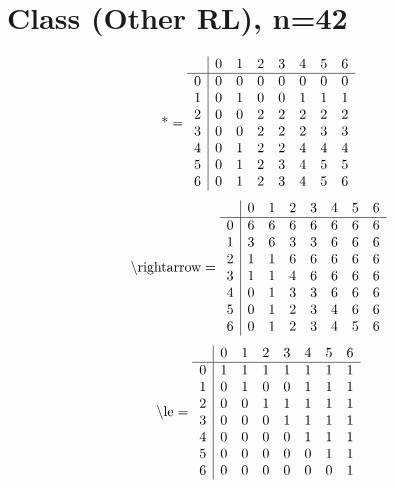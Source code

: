 \documentclass[11pt]{article}
\begin{document}
\section{Class (Other RL), n=42}
\[\text{*} = 
\begin{array}{r | r r r r r r r}
 & 0 & 1 & 2 & 3 & 4 & 5 & 6 \\ \hline
0 & 0 & 0 & 0 & 0 & 0 & 0 & 0 \\
1 & 0 & 1 & 0 & 0 & 1 & 1 & 1 \\
2 & 0 & 0 & 2 & 2 & 2 & 2 & 2 \\
3 & 0 & 0 & 2 & 2 & 2 & 3 & 3 \\
4 & 0 & 1 & 2 & 2 & 4 & 4 & 4 \\
5 & 0 & 1 & 2 & 3 & 4 & 5 & 5 \\
6 & 0 & 1 & 2 & 3 & 4 & 5 & 6 \\
\end{array}
\]
\[\text{\textbackslash rightarrow} = 
\begin{array}{r | r r r r r r r}
 & 0 & 1 & 2 & 3 & 4 & 5 & 6 \\ \hline
0 & 6 & 6 & 6 & 6 & 6 & 6 & 6 \\
1 & 3 & 6 & 3 & 3 & 6 & 6 & 6 \\
2 & 1 & 1 & 6 & 6 & 6 & 6 & 6 \\
3 & 1 & 1 & 4 & 6 & 6 & 6 & 6 \\
4 & 0 & 1 & 3 & 3 & 6 & 6 & 6 \\
5 & 0 & 1 & 2 & 3 & 4 & 6 & 6 \\
6 & 0 & 1 & 2 & 3 & 4 & 5 & 6 \\
\end{array}
\]
\[\text{\textbackslash le} = 
\begin{array}{r | r r r r r r r}
 & 0 & 1 & 2 & 3 & 4 & 5 & 6 \\ \hline
0 & 1 & 1 & 1 & 1 & 1 & 1 & 1 \\
1 & 0 & 1 & 0 & 0 & 1 & 1 & 1 \\
2 & 0 & 0 & 1 & 1 & 1 & 1 & 1 \\
3 & 0 & 0 & 0 & 1 & 1 & 1 & 1 \\
4 & 0 & 0 & 0 & 0 & 1 & 1 & 1 \\
5 & 0 & 0 & 0 & 0 & 0 & 1 & 1 \\
6 & 0 & 0 & 0 & 0 & 0 & 0 & 1 \\
\end{array}
\]
\end{document}
